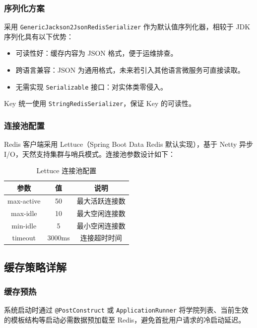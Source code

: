 \subsubsection{序列化方案}

采用 \texttt{GenericJackson2JsonRedisSerializer} 作为默认值序列化器，相较于 JDK 序列化具有以下优势：
\begin{itemize}
    \item 可读性好：缓存内容为 JSON 格式，便于运维排查。
    \item 跨语言兼容：JSON 为通用格式，未来若引入其他语言微服务可直接读取。
    \item 无需实现 \texttt{Serializable} 接口：对实体类零侵入。
\end{itemize}

Key 统一使用 \texttt{StringRedisSerializer}，保证 Key 的可读性。

\subsubsection{连接池配置}

Redis 客户端采用 Lettuce（Spring Boot Data Redis 默认实现），基于 Netty 异步 I/O，天然支持集群与哨兵模式。连接池参数设计如下：

\begin{table}[htbp]
\centering
\caption{Lettuce 连接池配置}
\label{tab:lettuce-config}
\begin{tabular}{|c|c|c|}
\hline
\textbf{参数} & \textbf{值} & \textbf{说明} \\
\hline
max-active & 50 & 最大活跃连接数 \\
\hline
max-idle & 10 & 最大空闲连接数 \\
\hline
min-idle & 5 & 最小空闲连接数 \\
\hline
timeout & 3000ms & 连接超时时间 \\
\hline
\end{tabular}
\end{table}

\subsection{缓存策略详解}

\subsubsection{缓存预热}

系统启动时通过 \texttt{@PostConstruct} 或 \texttt{ApplicationRunner} 将学院列表、当前生效的模板结构等启动必需数据预加载至 Redis，避免首批用户请求的冷启动延迟。

